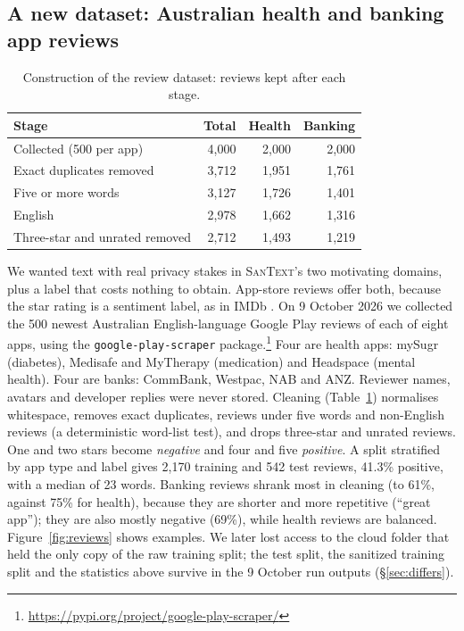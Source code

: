 \documentclass[11pt]{article}
\newcommand{\santext}{\textsc{SanText}}
\begin{document}
\subsection{A new dataset: Australian health and banking app reviews}
\begin{table}[t]
\centering\small
\setlength{\tabcolsep}{4pt}
\begin{tabular}{@{}lrrr@{}}
\toprule
Stage & Total & Health & Banking \\
\midrule
Collected (500 per app) & 4,000 & 2,000 & 2,000 \\
Exact duplicates removed & 3,712 & 1,951 & 1,761 \\
Five or more words & 3,127 & 1,726 & 1,401 \\
English & 2,978 & 1,662 & 1,316 \\
Three-star and unrated removed & 2,712 & 1,493 & 1,219 \\
\bottomrule
\end{tabular}
\caption{Construction of the review dataset: reviews kept after each stage.}
\label{tab:funnel}
\end{table}
We wanted text with real privacy stakes in \santext{}'s two motivating domains, plus a label that costs nothing to obtain. App-store reviews offer both, because the star rating is a sentiment label, as in IMDb \citep{maas-etal-2011-learning}. On 9 October 2026 we collected the 500 newest Australian English-language Google Play reviews of each of eight apps, using the \texttt{google-play-scraper} package.\footnote{\url{https://pypi.org/project/google-play-scraper/}} Four are health apps: mySugr (diabetes), Medisafe and MyTherapy (medication) and Headspace (mental health). Four are banks: CommBank, Westpac, NAB and ANZ. Reviewer names, avatars and developer replies were never stored. Cleaning (Table~\ref{tab:funnel}) normalises whitespace, removes exact duplicates, reviews under five words and non-English reviews (a deterministic word-list test), and drops three-star and unrated reviews. One and two stars become \emph{negative} and four and five \emph{positive}. A split stratified by app type and label gives 2,170 training and 542 test reviews, 41.3\% positive, with a median of 23 words. Banking reviews shrank most in cleaning (to 61\%, against 75\% for health), because they are shorter and more repetitive (``great app''); they are also mostly negative (69\%), while health reviews are balanced. Figure~\ref{fig:reviews} shows examples. We later lost access to the cloud folder that held the only copy of the raw training split; the test split, the sanitized training split and the statistics above survive in the 9 October run outputs (§\ref{sec:differs}).
\end{document}
